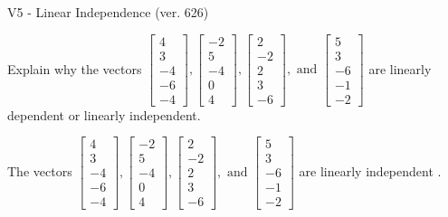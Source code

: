 \begin{exercise}
  \begin{exerciseTitle}V5 - Linear Independence (ver. 626)\end{exerciseTitle}
  \begin{exerciseStatement}
    Explain why the vectors \(\left[\begin{array}{r}
4 \\
3 \\
-4 \\
-6 \\
-4
\end{array}\right] , \left[\begin{array}{r}
-2 \\
5 \\
-4 \\
0 \\
4
\end{array}\right] , \left[\begin{array}{r}
2 \\
-2 \\
2 \\
3 \\
-6
\end{array}\right] , \text{ and } \left[\begin{array}{r}
5 \\
3 \\
-6 \\
-1 \\
-2
\end{array}\right]\) are linearly dependent or linearly independent.	


  \end{exerciseStatement}
  \begin{exerciseAnswer}
   The vectors \(\left[\begin{array}{r}
4 \\
3 \\
-4 \\
-6 \\
-4
\end{array}\right] , \left[\begin{array}{r}
-2 \\
5 \\
-4 \\
0 \\
4
\end{array}\right] , \left[\begin{array}{r}
2 \\
-2 \\
2 \\
3 \\
-6
\end{array}\right] , \text{ and } \left[\begin{array}{r}
5 \\
3 \\
-6 \\
-1 \\
-2
\end{array}\right]\) are 
  	 linearly independent  .
  


  \end{exerciseAnswer}
\end{exercise}